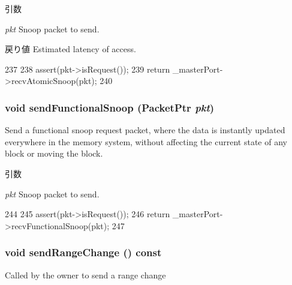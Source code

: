 \begin{DoxyParams}{引数}
\item[{\em pkt}]Snoop packet to send.\end{DoxyParams}
\begin{DoxyReturn}{戻り値}
Estimated latency of access. 
\end{DoxyReturn}



\begin{DoxyCode}
237 {
238     assert(pkt->isRequest());
239     return _masterPort->recvAtomicSnoop(pkt);
240 }
\end{DoxyCode}
\hypertarget{classSlavePort_a821cf873ae00e77f71d77505a63cfed7}{
\subsubsection[{sendFunctionalSnoop}]{\setlength{\rightskip}{0pt plus 5cm}void sendFunctionalSnoop ({\bf PacketPtr} {\em pkt})}}
\label{classSlavePort_a821cf873ae00e77f71d77505a63cfed7}
Send a functional snoop request packet, where the data is instantly updated everywhere in the memory system, without affecting the current state of any block or moving the block.


\begin{DoxyParams}{引数}
\item[{\em pkt}]Snoop packet to send. \end{DoxyParams}



\begin{DoxyCode}
244 {
245     assert(pkt->isRequest());
246     return _masterPort->recvFunctionalSnoop(pkt);
247 }
\end{DoxyCode}
\hypertarget{classSlavePort_afb438cc39c4c679860c791bcef6dc7f3}{
\subsubsection[{sendRangeChange}]{\setlength{\rightskip}{0pt plus 5cm}void sendRangeChange () const}}
\label{classSlavePort_afb438cc39c4c679860c791bcef6dc7f3}
Called by the owner to send a range change 


